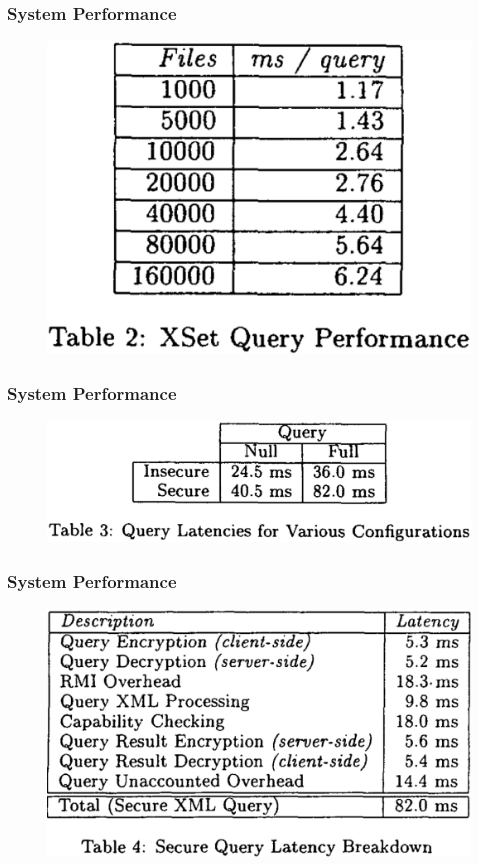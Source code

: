 \documentclass{beamer}
\begin{document}
\begin{frame}[fragile] %
\frametitle{System Performance}
\begin{figure}
\includegraphics[scale=0.2]{t2}
\end{figure}
\end{frame}

\begin{frame}[fragile] %
\frametitle{System Performance}
\begin{figure}
\includegraphics[scale=0.2]{t3}
\end{figure}
\end{frame}


\begin{frame}[fragile] %
\frametitle{System Performance}
\begin{figure}
\includegraphics[scale=0.2]{t4}
\end{figure}
\end{frame}
\end{document}
